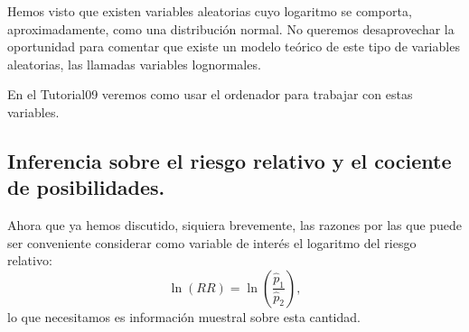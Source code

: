 Hemos visto que existen variables aleatorias cuyo logaritmo se comporta, aproximadamente, como una distribución normal. No queremos desaprovechar la oportunidad para comentar que existe un modelo teórico de este tipo de variables aleatorias, las llamadas {\sf variables lognormales}.

\begin{center}
\end{center}
En el Tutorial09 veremos como usar el ordenador para trabajar con estas variables.


\subsection{Inferencia sobre el riesgo relativo y el cociente de posibilidades.}
\label{cap09:subsec:InferenciaRiesgoRelativo}

Ahora que ya hemos discutido, siquiera brevemente, las razones por las que puede ser conveniente considerar como variable de interés el logaritmo del riesgo relativo:
\[\ln(RR)=\ln\left(\dfrac{\hat p_1}{\hat p_2}\right),\]
lo que necesitamos es información muestral sobre esta cantidad.


